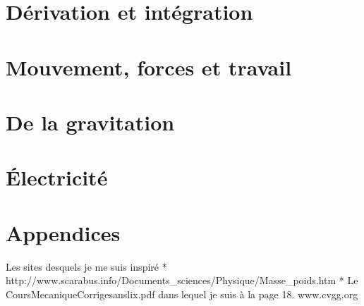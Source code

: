 
\chapter{Dérivation et intégration}
	

\chapter{Mouvement, forces et travail}
	
	
	
	
	

\chapter{De la gravitation}
	

\chapter{Électricité}
	


%	

\appendix

\chapter*{Appendices}

\pagestyle{plain}

\setcounter{section}{0}
\renewcommand{\theequation}{\Alph{section}.\arabic{equation}}
\renewcommand{\thenumtho}{\Alph{section}.\arabic{numtho}}
\renewcommand{\thesection}{\Alph{section}}

	
	
\printindex



Les sites desquels je me suis inspiré
  * http://www.scarabus.info/Documents_sciences/Physique/Masse_poids.htm
  * Le CoursMecaniqueCorrigesanslix.pdf dans lequel je suis à la page 18.
     www.cvgg.org
